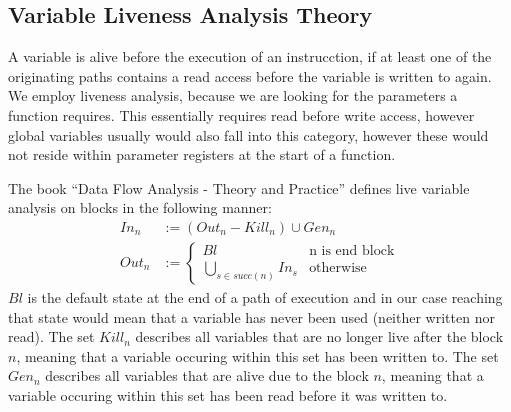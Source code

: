 \subsection{Variable Liveness Analysis Theory}
\label{subsection:livenessanalysis}
A variable is alive before the execution of an instrucction, if at least one of the originating paths contains a read access before the variable is written to again. We employ liveness analysis, because we are looking for the  parameters a function requires. This essentially requires read before write access, however global variables usually would also fall into this category, however these would not reside within parameter registers at the start of a function.

The book ``Data Flow Analysis - Theory and Practice'' \cite{dataflowanalysis} defines live variable analysis on blocks in the following manner:
\begin{subequations}
\label{eq:livenessbasedef}
\begin{align}
In_n &:= (Out_n - Kill_n) \cup Gen_n \label{eq:livenessbasedefIn} \\
Out_n &:= \left\{
  \begin{array}{lr}
    Bl & \text{n is end block}\\
    \underset{s \in succ(n)}{\bigcup} In_s & \text{otherwise}
  \end{array}
\right. \label{eq:livenessbasedefOut}
\end{align}
\end{subequations}
$Bl$ is the default state at the end of a path of execution and in our case reaching that state would mean that a variable has never been used (neither written nor read). The set $Kill_n$ describes all variables that are no longer live after the block $n$, meaning that a variable occuring within this set has been written to. The set $Gen_n$ describes all variables that are alive due to the block $n$, meaning that a variable occuring within this set has been read before it was written to.

